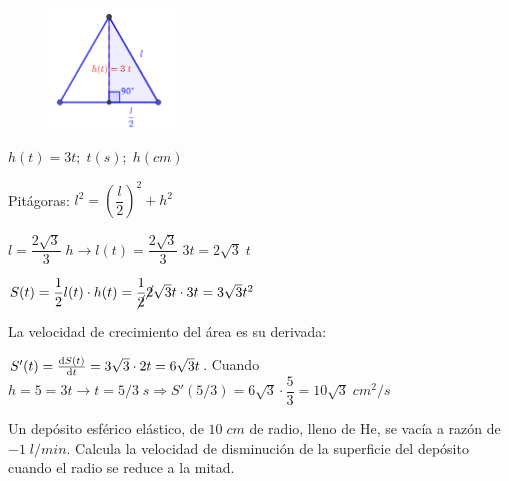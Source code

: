 	\begin{proofw}\renewcommand{\qedsymbol}{$\diamond$}
	 
	\begin{multicols}{2}
	
	\begin{figure}[H]
		\centering
		\includegraphics[width=0.3\textwidth]{imagenes/imagenes04/T04IM14.png}
	\end{figure}
		$h(t)=3t; \; t(s);\; h(cm)$
		
		Pitágoras: $l^2= \left(\dfrac l 2 \right)^2+ h^2$
		
	
		$ l=\dfrac {2 \sqrt{3}}{3}\; h \to l(t)=\dfrac {2 \sqrt{3}}{3} \; 3t =2 \sqrt{3} \; t$
		
		
		
		$S(t)=\dfrac 1 2 l(t) \cdot h(t)= \dfrac 1{ \cancel{2}} \cancel{2} \sqrt{3} t \cdot 3t=3 \sqrt{3} t^2$
		\end{multicols}
		La velocidad de crecimiento del área es su derivada:
		


	$S'(t)= \dv {S(t)}{t}=3\sqrt{3}\cdot 2t= 6\sqrt{3}t$. Cuando $h=5=3t \to t=5/3\; s \Rightarrow S'(5/3)=6\sqrt{3}\cdot \dfrac 5 3=10\sqrt{3}\; cm^2/s$
	
	\end{proofw}
	
	
	\begin{ejre} Un depósito esférico elástico, de $10\; cm$ de radio, lleno de He, se vacía a razón de $-1\; l/min$. Calcula la velocidad de disminución de la superficie del depósito cuando el radio se reduce a la mitad.
		
	\end{ejre}
	
